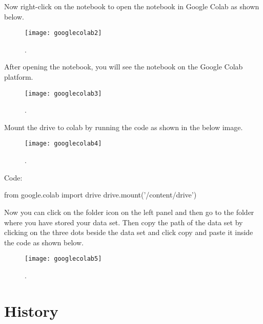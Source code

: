 Now right-click on the notebook to open the notebook in Google Colab as shown below.

	\begin{figure}[h]
		\centering
		\texttt{[image: googlecolab2]}
		\caption{.}
		\label{fig:googlecolab2}
	\end{figure}

After opening the notebook, you will see the notebook on the Google Colab platform.

	\begin{figure}[h]
		\centering
		\texttt{[image: googlecolab3]}
		\caption{.}
		\label{fig:googlecolab3}
	\end{figure}

Mount the drive to colab by running the code as shown in the below image.

 	\begin{figure}[h]
		\centering
		\texttt{[image: googlecolab4]}
		\caption{.}
		\label{fig:googlecolab4}
	\end{figure}

Code:

from google.colab import drive
drive.mount('/content/drive')

Now you can click on the folder icon on the left panel and then go to the folder where you have stored your data set. Then copy the path of the data set by clicking on the three dots beside the data set and click copy and paste it inside the code as shown below.

 	\begin{figure}[h]
		\centering
		\texttt{[image: googlecolab5]}
		\caption{.}
		\label{fig:googlecolab5}
	\end{figure}


	\section{History}

